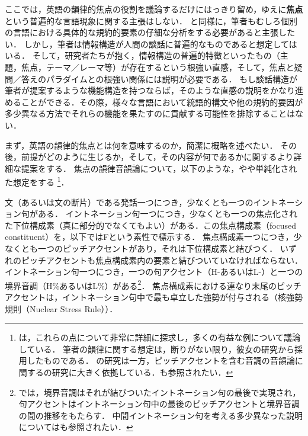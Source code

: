 \documentclass{goken}
\newcommand{\term}[2]{\textsf{#1}（#2）}
\newcommand{\ori}[1]{\noindent\textcolor[gray]{0.7}{\fontsize{8pt}{8pt}\selectfont{\textsf{(p.~#1)}}} }
\begin{document}
ここでは，英語の韻律的焦点の役割を議論するだけにはっきり留め，ゆえに\textbf{焦点}という普遍的な言語現象に関する主張はしない．
\citet{Rooth1996}と同様に，筆者もむしろ個別の言語における具体的な規約的要素の仔細な分析をする必要があると主張したい．
しかし，筆者は情報構造が人間の談話に普遍的なものであると想定してはいる．
そして，研究者たちが抱く，情報構造の普遍的特徴といったもの（主題，焦点，テーマ／レーマ等）が存在するという根強い直感，そして，焦点と疑問／答えのパラダイムとの根強い関係には説明が必要である．
もし談話構造が筆者が提案するような機能構造を持つならば，そのような直感の説明をかなり進めることができる．その際，様々な言語において統語的構文や他の規約的要因が多少異なる方法でそれらの機能を果たすのに貢献する可能性を排除することはない．

まず，英語の韻律的焦点とは何を意味するのか，簡潔に概略を述べたい．
その後，前提がどのように生じるか，そして，その内容が何であるかに関するより詳細な提案をする．
焦点の韻律音韻論について，以下のような，やや単純化された想定をする
\footnote{%
  \citet{Selkirk1984}は，これらの点について非常に詳細に探求し，多くの有益な例について議論している．
  筆者の韻律に関する想定は，断りがない限り，彼女の研究から採用したものである．
  \citeauthor{Selkirk1984}の研究は一方，ピッチアクセントを含む音調の音韻論に関する\citet{Pierrehumbert1980}の研究に大きく依拠している．\citet{LibermanPierrehumbert1984}も参照されたい．
}．

\ori{29}
\setcounter{exx}{21}
\begin{exe}
\renewcommand{\thefootnote}{\fnsymbol{footnote}}
\setcounter{footnote}{0}
	 \label{ex:22}
\renewcommand{\thefootnote}{\arabic{footnote}~}
\setcounter{footnote}{16}
	\begin{xlist}
		\ex 文（あるいは文の断片）である発話一つにつき，少なくとも一つのイントネーション句がある．
		\ex イントネーション句一つにつき，少なくとも一つの焦点化された下位構成素（真に部分的でなくてもよい）がある．この\term{焦点構成素}{focused constituent}を，以下ではFという素性で標示する．
		\ex 焦点構成素一つにつき，少なくとも一つのピッチアクセントがあり，それは下位構成素と結びつく．
		\ex いずれのピッチアクセントも焦点構成素内の要素と結びついていなければならない．\label{ex:22d}
		\ex イントネーション句一つにつき，一つの句アクセント（H-あるいはL-）と一つの境界音調（H\%あるいはL\%）がある\footnote{%
			\citealt{LibermanPierrehumbert1984}では，境界音調はそれが結びついたイントネーション句の最後で実現され，句アクセントはイントネーション句中の最後のピッチアクセントと境界音調の間の推移をもたらす．
			中間イントネーション句を考える多少異なった説明については\citealt{BeckmanAyers1997}も参照されたい．}．
		\ex 焦点構成素における連なり末尾のピッチアクセントは，イントネーション句中で最も卓立した強勢が付与される（\term{核強勢規則}{Nuclear Stress Rule}）．
	\end{xlist}
\end{exe}
\end{document}

